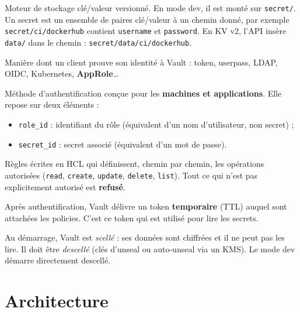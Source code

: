 \documentclass[11pt,a4paper]{article}
\newcommand{\vpath}[1]{\texttt{#1}}
\begin{document}
\begin{description}[leftmargin=0pt, style=nextline]
  \item[Secret engine KV v2]
    Moteur de stockage clé/valeur versionné. En mode dev, il est monté sur
    \vpath{secret/}. Un secret est un ensemble de paires clé/valeur à un chemin donné,
    par exemple \vpath{secret/ci/dockerhub} contient \texttt{username} et
    \texttt{password}. En KV v2, l'API insère \vpath{data/} dans le chemin :
    \vpath{secret/data/ci/dockerhub}.

  \item[Méthode d'authentification (auth method)]
    Manière dont un client prouve son identité à Vault : token, userpass, LDAP, OIDC,
    Kubernetes, \textbf{AppRole}\ldots

  \item[AppRole]
    Méthode d'authentification conçue pour les \textbf{machines et applications}.
    Elle repose sur deux éléments :
    \begin{itemize}
      \item \texttt{role\_id} : identifiant du rôle (équivalent d'un nom d'utilisateur,
            non secret) ;
      \item \texttt{secret\_id} : secret associé (équivalent d'un mot de passe).
    \end{itemize}

  \item[Policy]
    Règles écrites en HCL qui définissent, chemin par chemin, les opérations autorisées
    (\texttt{read}, \texttt{create}, \texttt{update}, \texttt{delete}, \texttt{list}).
    Tout ce qui n'est pas explicitement autorisé est \textbf{refusé}.

  \item[Token]
    Après authentification, Vault délivre un token \textbf{temporaire} (TTL) auquel sont
    attachées les policies. C'est ce token qui est utilisé pour lire les secrets.

  \item[Seal / Unseal]
    Au démarrage, Vault est \emph{scellé} : ses données sont chiffrées et il ne peut pas
    les lire. Il doit être \emph{descellé} (clés d'unseal ou auto-unseal via un KMS).
    Le mode dev démarre directement descellé.
\end{description}

\section{Architecture}
\end{document}
